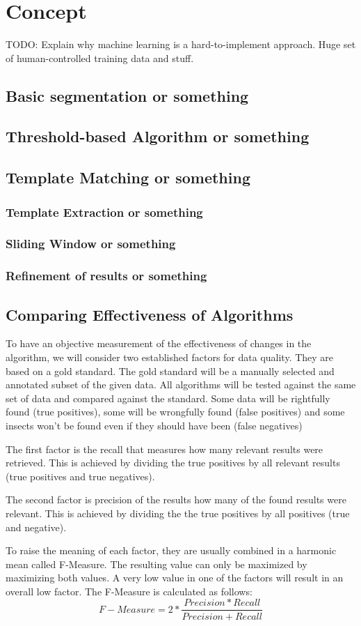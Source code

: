%
\section{Concept}
\label{sec_concept}

TODO: Explain why machine learning is a hard-to-implement approach. Huge set of human-controlled training data and stuff.

\subsection{Basic segmentation or something}
\subsection{Threshold-based Algorithm or something}
\subsection{Template Matching or something}
\subsubsection{Template Extraction or something}
\subsubsection{Sliding Window or something}
\subsubsection{Refinement of results or something}

\subsection{Comparing Effectiveness of Algorithms}
To have an objective measurement of the effectiveness of changes in the algorithm, we will consider two established factors for data quality. 
They are based on a gold standard. 
The gold standard will be a manually selected and annotated subset of the given data. 
All algorithms will be tested against the same set of data and compared against the standard.
Some data will be rightfully found (true positives), some will be wrongfully found (false positives) and some insects won't be found even if they should have been (false negatives)

The first factor is the recall that measures how many relevant results were retrieved. 
This is achieved by dividing the true positives by all relevant results (true positives and true negatives).

The second factor is precision of the results how many of the found results were relevant. 
This is achieved by dividing the the true positives by all positives (true and negative).

To raise the meaning of each factor, they are usually combined in a harmonic mean called F-Measure. 
The resulting value can only be maximized by maximizing both values. 
A very low value in one of the factors will result in an overall low factor. 
The F-Measure is calculated as follows: 
\[
F-Measure = 2*\frac{Precision*Recall}{Precision+Recall}
\]